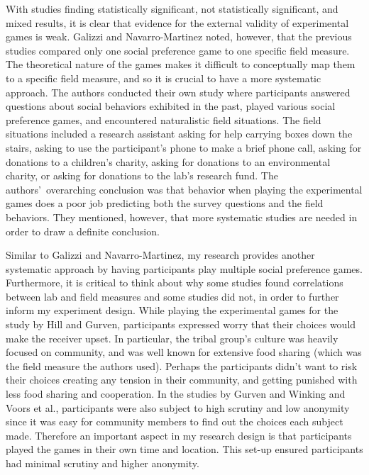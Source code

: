 \documentclass[12pt]{article}
\begin{document}
With studies finding statistically significant, not statistically significant, and mixed results, it is clear that evidence for the external validity of experimental games is weak. Galizzi and Navarro-Martinez noted, however, that the previous studies compared only one social preference game to one specific field measure. The theoretical nature of the games makes it difficult to conceptually map them to a specific field measure, and so it is crucial to have a more systematic approach. The authors conducted their own study where participants answered questions about social behaviors exhibited in the past, played various social preference games, and encountered naturalistic field situations. The field situations included a research assistant asking for help carrying boxes down the stairs, asking to use the participant\rq s phone to make a brief phone call, asking for donations to a children\rq s charity, asking for donations to an environmental charity, or asking for donations to the lab\rq s research fund.  The authors\rq \ overarching conclusion was that behavior when playing the experimental games does a poor job predicting both the survey questions and the field behaviors. They mentioned, however, that more systematic studies are needed in order to draw a definite conclusion.

Similar to Galizzi and Navarro-Martinez, my research provides another systematic approach by having participants play multiple social preference games. Furthermore, it is critical to think about why some studies found correlations between lab and field measures and some studies did not, in order to further inform my experiment design. While playing the experimental games for the study by Hill and Gurven, participants expressed worry that their choices would make the receiver upset. In particular, the tribal group\rq s culture was heavily focused on community, and was well known for extensive food sharing (which was the field measure the authors used). Perhaps the participants didn\rq t want to risk their choices creating any tension in their community, and getting punished with less food sharing and cooperation. In the studies by Gurven and Winking and Voors et al., participants were also subject to high scrutiny and low anonymity since it was easy for community members to find out the choices each subject made. Therefore an important aspect in my research design is that participants played the games in their own time and location. This set-up ensured participants had minimal scrutiny and higher anonymity. 
\end{document}
